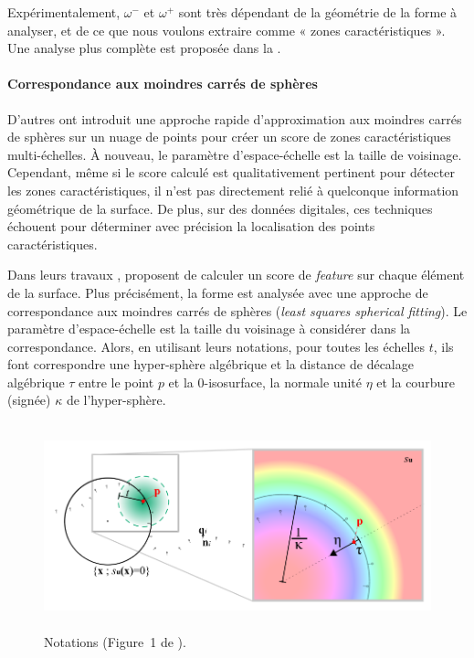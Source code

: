 Expérimentalement, $\omega^-$ et $\omega^+$ sont très dépendant de la géométrie
de la forme à analyser, et de ce que nous voulons extraire comme « zones
caractéristiques ». Une analyse plus complète est proposée dans la
.

\paragraph{Correspondance aux moindres carrés de sphères}
\label{sec:applications:feature:growing}

D'autres \cite{Mellado2012} ont introduit une approche rapide d'approximation
aux moindres carrés de sphères sur un nuage de points pour créer un score de zones caractéristiques multi-échelles. À nouveau, le paramètre d'espace-échelle est la taille de voisinage. Cependant, même si le score calculé est qualitativement pertinent pour détecter les zones caractéristiques, il n'est pas directement relié à quelconque information géométrique de la surface. De plus, sur des données digitales, ces techniques échouent pour déterminer avec précision la localisation des points caractéristiques.

Dans leurs travaux \cite{Mellado2012},  proposent de
calculer un score de \emph{feature} sur chaque élément de la surface. Plus
précisément, la forme est analysée avec une approche de correspondance aux
moindres carrés de sphères (\emph{least squares spherical fitting}). Le
paramètre d'espace-échelle est la taille du voisinage à considérer dans la
correspondance. Alors, en utilisant leurs notations, pour toutes les échelles
$t$, ils font correspondre une hyper-sphère algébrique et la distance de
décalage algébrique $\tau$ entre le point $p$ et la $0$-isosurface, la normale
unité $\eta$ et la courbure (signée) $\kappa$ de l'hyper-sphère.

\begin{figure}[ht]{
    \begin{center}
    \includegraphics[height=6cm]{images/Feature/Mellado_notations}
    \end{center}}
    \caption[Notations.]{Notations (Figure~1 de \cite{Mellado2012}).
      \label{fig:mellado-notations}}
\end{figure}

